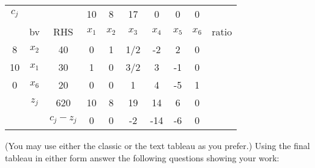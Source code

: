 \documentclass[answers]{exam}
\begin{document}
\begin{questions}
\begin{tabular}{cccccccccc}
	$c_j$                   &                            &                                & 10    & 8     & 17    & 0     & 0     & 0     &       \\
	\multicolumn{1}{c|}{}   & \multicolumn{1}{c|}{bv}    & \multicolumn{1}{c|}{RHS}       & $x_1$ & $x_2$ & $x_3$ & $x_4$ & $x_5$ & $x_6$ & ratio \\ \cline{1-9}
	\multicolumn{1}{c|}{8}  & \multicolumn{1}{c|}{$x_2$} & \multicolumn{1}{c|}{40}        & 0     & 1     & 1/2   & -2    & 2     & 0     &       \\
	\multicolumn{1}{c|}{10} & \multicolumn{1}{c|}{$x_1$} & \multicolumn{1}{c|}{30}        & 1     & 0     & 3/2   & 3     & -1    & 0     &       \\
	\multicolumn{1}{c|}{0}  & \multicolumn{1}{c|}{$x_6$} & \multicolumn{1}{c|}{20}        & 0     & 0     & 1     & 4     & -5    & 1     &       \\ \cline{1-9}
	& \multicolumn{1}{c|}{$z_j$} & \multicolumn{1}{c|}{620}       & 10    & 8     & 19    & 14    & 6     & 0     &       \\ \cline{3-9}
	&                            & \multicolumn{1}{c|}{$c_j-z_j$} & 0     & 0     & -2    & -14   & -6    & 0     &      
\end{tabular}

(You may use either the classic or the text tableau as you prefer.)
Using the final tableau in either form answer the following questions showing your work:
\end{questions}
\end{document}
